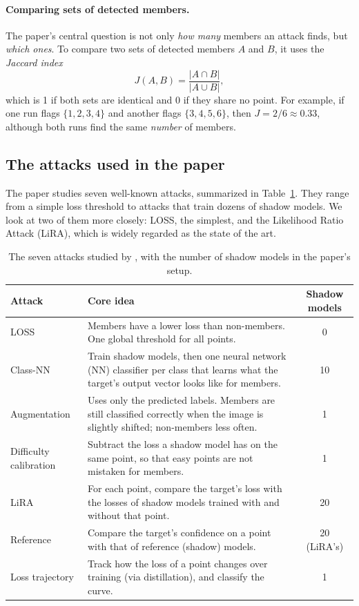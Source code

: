 \documentclass[a4paper]{article}
\begin{document}
\paragraph{Comparing sets of detected members.}
The paper's central question is not only \emph{how many} members an attack finds, but \emph{which ones}.
To compare two sets of detected members $A$ and $B$, it uses the \emph{Jaccard index}
\[
  J(A, B) = \frac{|A \cap B|}{|A \cup B|},
\]
which is 1 if both sets are identical and 0 if they share no point.
For example, if one run flags $\{1,2,3,4\}$ and another flags $\{3,4,5,6\}$, then $J = 2/6 \approx 0.33$, although both runs find the same \emph{number} of members.

\subsection{The attacks used in the paper}
\label{subsec:attacks}

The paper studies seven well-known attacks, summarized in Table~\ref{tab:attacks}.
They range from a simple loss threshold to attacks that train dozens of shadow models.
We look at two of them more closely: LOSS, the simplest, and the Likelihood Ratio Attack (LiRA), which is widely regarded as the state of the art.

\begin{table}[!htb]
  \centering
  \small
  \renewcommand{\arraystretch}{1.25}
  \begin{tabularx}{\textwidth}{@{}l X c@{}}
    \toprule
    Attack & Core idea & Shadow models \\
    \midrule
    LOSS \citep{yeom2018privacy} & Members have a lower loss than non-members. One global threshold for all points. & 0 \\
    Class-NN \citep{shokri2017membership} & Train shadow models, then one neural network (NN) classifier per class that learns what the target's output vector looks like for members. & 10 \\
    Augmentation \citep{choquette2021label} & Uses only the predicted labels. Members are still classified correctly when the image is slightly shifted; non-members less often. & 1 \\
    Difficulty calibration \citep{watson2022importance} & Subtract the loss a shadow model has on the same point, so that easy points are not mistaken for members. & 1 \\
    LiRA \citep{carlini2022membership} & For each point, compare the target's loss with the losses of shadow models trained with and without that point. & 20 \\
    Reference \citep{ye2022enhanced} & Compare the target's confidence on a point with that of reference (shadow) models. & 20 (LiRA's) \\
    Loss trajectory \citep{liu2022membership} & Track how the loss of a point changes over training (via distillation), and classify the curve. & 1 \\
    \bottomrule
  \end{tabularx}
  \caption{The seven attacks studied by \citet{wang2025mia}, with the number of shadow models in the paper's setup.}
  \label{tab:attacks}
\end{table}
\end{document}
